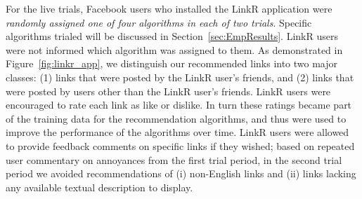For the live trials, Facebook users who installed the LinkR
application were \emph{randomly assigned one of four algorithms in
each of two trials}.  Specific algorithms trialed will be discussed in
Section~\ref{sec:EmpResults}.  LinkR users were not informed which
algorithm was assigned to them.  As demonstrated in
Figure~\ref{fig:linkr_app}, we distinguish our recommended links into
two major classes: (1) links that were posted by the LinkR user's
friends, and (2) links that were posted by users other than the LinkR
user's friends.  LinkR users were encouraged to rate each link as like
or dislike.  In turn these ratings became part of the training data
for the recommendation algorithms, and thus were used to improve the
performance of the algorithms over time.  LinkR users were allowed to
provide feedback comments on specific links if they wished; based on
repeated user commentary on annoyances 
from the first trial period, in the second trial period we avoided
recommendations of 
(i) non-English links and (ii) links lacking any available 
textual description to display.

 